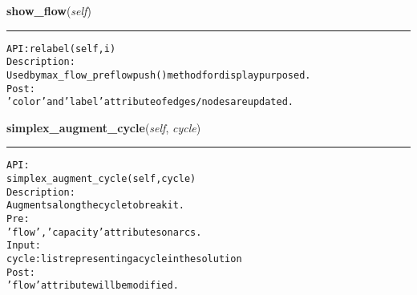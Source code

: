     \label{coinor:gimpy:graph:Graph:show_flow}

    \vspace{0.5ex}

\hspace{.8\funcindent}\begin{boxedminipage}{\funcwidth}

    \raggedright \textbf{show\_flow}(\textit{self})

    \vspace{-1.5ex}

    \rule{\textwidth}{0.5\fboxrule}
\setlength{\parskip}{2ex}
\begin{alltt}

API: relabel(self, i)
Description:
Used by max\_flow\_preflowpush() method for display purposed.
Post:
    'color' and 'label' attribute of edges/nodes are updated.
\end{alltt}

\setlength{\parskip}{1ex}
    \end{boxedminipage}

    \label{coinor:gimpy:graph:Graph:simplex_augment_cycle}

    \vspace{0.5ex}

\hspace{.8\funcindent}\begin{boxedminipage}{\funcwidth}

    \raggedright \textbf{simplex\_augment\_cycle}(\textit{self}, \textit{cycle})

    \vspace{-1.5ex}

    \rule{\textwidth}{0.5\fboxrule}
\setlength{\parskip}{2ex}
\begin{alltt}

API:
    simplex\_augment\_cycle(self, cycle)
Description:
    Augments along the cycle to break it.
Pre:
    'flow', 'capacity' attributes on arcs.
Input:
    cycle: list representing a cycle in the solution
Post:
    'flow' attribute will be modified.
\end{alltt}

\setlength{\parskip}{1ex}
    \end{boxedminipage}

